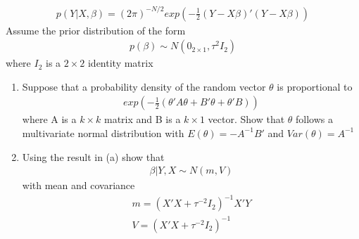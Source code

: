 \documentclass[12pt,onecolumn]{article}
\begin{document}
\begin{enumerate}
  \begin{align}
  p(Y|X,\beta) = (2\pi)^{-N/2}exp \left( -\frac{1}{2} (Y-X\beta)'(Y-X\beta) \right) 
  \end{align}
  Assume the prior distribution of the form 
  \begin{align}
  p(\beta)\sim N(0_{2\times1},\tau^2I_2)
  \end{align}
  where $I_2$ is a $2\times2$ identity matrix
  \begin{enumerate}
    \item Suppose that a probability density of the random vector $\theta$ is proportional to
    \begin{align}
    exp \left( -\frac{1}{2} (\theta'A\theta+B'\theta+\theta'B) \right) 
    \end{align}
    where A is a $k\times k$ matrix and B is a $k\times 1$ vector. Show that $\theta$ follows a multivariate normal distribution with
    $E(\theta)= - A^{-1}B'$ and $Var(\theta)=A^{-1}$
    \item  Using the result in (a) show that
    \begin{align}
    \beta|Y,X \sim N(m,V)
    \end{align}
    with mean and covariance
      \begin{align}
      m=(X'X + \tau^{-2} I_2)^{-1}X'Y \\ 
      V=(X'X + \tau^{-2} I_2)^{-1}
      \end{align}
  

\end{enumerate}
\end{enumerate}
\end{document}
